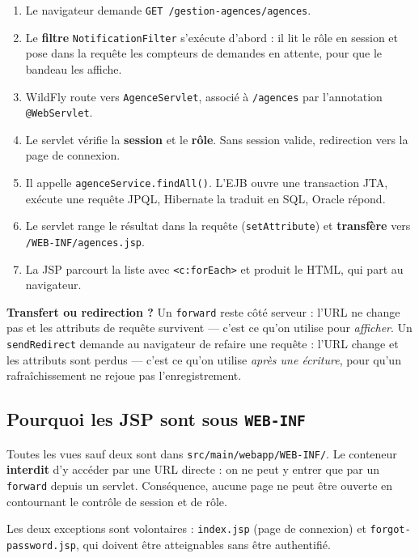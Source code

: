 \begin{enumerate}[leftmargin=*,itemsep=2pt]
  \item Le navigateur demande \texttt{GET /gestion-agences/agences}.
  \item Le \textbf{filtre} \texttt{NotificationFilter} s'exécute d'abord : il
        lit le rôle en session et pose dans la requête les compteurs de
        demandes en attente, pour que le bandeau les affiche.
  \item WildFly route vers \texttt{AgenceServlet}, associé à \texttt{/agences}
        par l'annotation \texttt{@WebServlet}.
  \item Le servlet vérifie la \textbf{session} et le \textbf{rôle}. Sans
        session valide, redirection vers la page de connexion.
  \item Il appelle \texttt{agenceService.findAll()}. L'EJB ouvre une
        transaction JTA, exécute une requête JPQL, Hibernate la traduit en SQL,
        Oracle répond.
  \item Le servlet range le résultat dans la requête
        (\texttt{setAttribute}) et \textbf{transfère} vers
        \texttt{/WEB-INF/agences.jsp}.
  \item La JSP parcourt la liste avec \texttt{<c:forEach>} et produit le HTML,
        qui part au navigateur.
\end{enumerate}

\begin{retenir}
\textbf{Transfert ou redirection ?} Un \texttt{forward} reste côté serveur :
l'URL ne change pas et les attributs de requête survivent --- c'est ce qu'on
utilise pour \emph{afficher}. Un \texttt{sendRedirect} demande au navigateur de
refaire une requête : l'URL change et les attributs sont perdus --- c'est ce
qu'on utilise \emph{après une écriture}, pour qu'un rafraîchissement ne
rejoue pas l'enregistrement.
\end{retenir}

\subsection{Pourquoi les JSP sont sous \texttt{WEB-INF}}

Toutes les vues sauf deux sont dans \texttt{src/main/webapp/WEB-INF/}. Le
conteneur \textbf{interdit} d'y accéder par une URL directe : on ne peut y
entrer que par un \texttt{forward} depuis un servlet. Conséquence, aucune page
ne peut être ouverte en contournant le contrôle de session et de rôle.

Les deux exceptions sont volontaires : \texttt{index.jsp} (page de connexion)
et \texttt{forgot-password.jsp}, qui doivent être atteignables sans être
authentifié.
